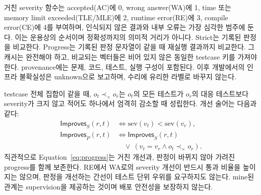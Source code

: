 \documentclass[10pt,conference]{IEEEtran}
\begin{document}
거친 severity 함수는 accepted(AC)에 0, wrong answer(WA)에 1, time 또는 memory limit exceeded(TLE/MLE)에 2, runtime error(RE)에 3, compile error(CE)에 4를 부여하며, 인식되지 않은 결과와 내부 오류는 가장 심각한 범주에 둔다. 이는 운용상의 순서이며 정확성까지의 의미적 거리가 아니다. Strict는 기록된 판정을 비교한다. Progress는 기록된 판정 문자열이 같을 때 재실행 결과까지 비교한다. 그 캐시는 완전해야 하고, 비교되는 벡터들은 비어 있지 않은 동일한 testcase 키를 가져야 한다. provenance에는 문제, 코드, 테스트, 실행 구성이 포함된다. 이후 개발에서의 인프라 불확실성은 unknown으로 보고하며, 수리에 유리한 라벨로 바꾸지 않는다.

testcase 전체 집합이 같을 때, \(o_t\prec_\times o_r\)는 \(o_t\)의 모든 테스트가 \(o_r\)의 대응 테스트보다 severity가 크지 않고 적어도 하나에서 엄격히 감소할 때 성립한다. 개선 술어는 다음과 같다:
\begin{equation}
\begin{aligned}
\mathsf{Improves}_S(r,t)&\iff \mathrm{sev}(v_t)<\mathrm{sev}(v_r),\\
\mathsf{Improves}_P(r,t)&\iff \mathsf{Improves}_S(r,t)\\
 &\quad\lor\ (v_t=v_r\land o_t\prec_\times o_r).
\end{aligned}
\label{eq:progress}
\end{equation}
직관적으로 Equation~\eqref{eq:progress}는 거친 개선과, 판정이 바뀌지 않아 가려진 progress를 함께 보존한다. RE에서 WA로의 severity 개선이 반드시 통과 비율을 높이지는 않으며, 판정을 개선하는 간선이 테스트 단위 우위를 요구하지도 않는다. mine된 관계는 supervision을 제공하는 것이며 배포 안전성을 보장하지 않는다.
\end{document}

